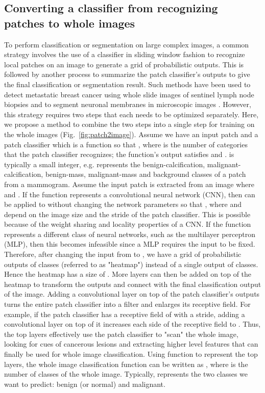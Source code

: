 \documentclass[12pt,letterpaper]{article}
\begin{document}
\subsection{Converting a classifier from recognizing patches to whole images}
To perform classification or segmentation on large complex images, a common strategy involves the use of a classifier in sliding window fashion to recognize local patches on an image to generate a grid of probabilistic outputs. This is followed by another process to summarize the patch classifier's outputs to give the final classification or segmentation result. Such methods have been used to detect metastatic breast cancer using whole slide images of sentinel lymph node biopsies \cite{wang_deep_2016} and to segment neuronal membranes in microscopic images \cite{ciresan_deep_2012}. However, this strategy requires two steps that each needs to be optimized separately. Here, we propose a method to combine the two steps into a single step for training on the whole images (Fig.~\ref{fig:patch2image}). Assume we have an input patch  and a patch classifier which is a function  so that , where  is the number of categories that the patch classifier recognizes; the function's output satisfies  and .  is typically a small integer, e.g.  represents the benign-calcification, malignant-calcification, benign-mass, malignant-mass and background classes of a patch from a mammogram. Assume the input patch is extracted from an image  where  and . If the function  represents a convolutional neural network (CNN), then  can be applied to  without changing the network parameters so that , where  and  depend on the image size and the stride of the patch classifier. This is possible because of the weight sharing and locality properties of a CNN. If the function  represents a different class of neural networks, such as the multilayer perceptron (MLP), then this becomes infeasible since a MLP requires the input to be fixed. Therefore, after changing the input from  to , we have a  grid of probabilistic outputs of  classes (referred to as "heatmap") instead of a single output of  classes. Hence the heatmap has a size of . More layers can then be added on top of the heatmap to transform the outputs and connect with the final classification output of the image. Adding a convolutional layer on top of the patch classifier's outputs turns the entire patch classifier into a filter and enlarges its receptive field. For example, if the patch classifier has a receptive field of  with a stride, adding a  convolutional layer on top of it increases each side of the receptive field to . Thus, the top layers effectively use the patch classifier to "scan" the whole image, looking for cues of cancerous lesions and extracting higher level features that can finally be used for whole image classification. Using function  to represent the top layers, the whole image classification function can be written as , where  is the number of classes of the whole image. Typically,  represents the two classes we want to predict: benign (or normal) and malignant. 
\end{document}
